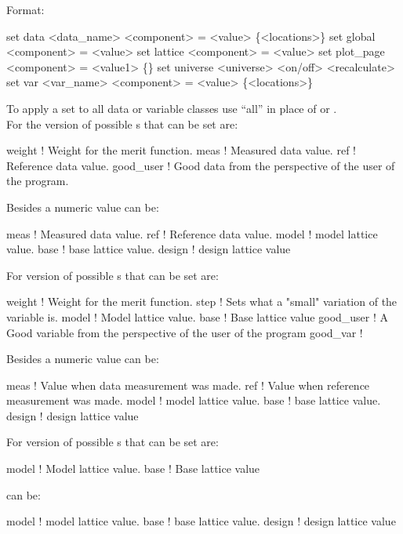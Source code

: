 Format:
\begin{example}
  set data <data_name> <component> = <value> \{<locations>\}
  set global <component> = <value>
  set lattice <component> = <value>
  set plot_page <component> = <value1> \{<value2>\}
  set universe <universe> <on/off> <recalculate>
  set var <var_name> <component> = <value> \{<locations>\}
\end{example}

\vskip 0.2in
To apply a set to all data or variable classes use ``all''
in place of  or . \\

For the  version of  possible 
s that can be set are:
\begin{example}
  weight      ! Weight for the merit function.
  meas        ! Measured data value.
  ref         ! Reference data value.
  good_user   ! Good data from the perspective of the user of the \tao program.
\end{example}
Besides a numeric value  can be:
\begin{example}
  meas        ! Measured data value.
  ref         ! Reference data value.
  model       ! model lattice value.
  base        ! base lattice value.
  design      ! design lattice value
\end{example}
\vskip 0.2in

For  version of  possible 
s that can be set are:
\begin{example}
  weight     ! Weight for the merit function.
  step       ! Sets what a "small" variation of the variable is.
  model      ! Model lattice value.
  base       ! Base lattice value
  good_user  ! A Good variable from the perspective of the user of the \tao program
  good_var   ! 
\end{example}
Besides a numeric value  can be:
\begin{example}
  meas        ! Value when data measurement was made.
  ref         ! Value when reference measurement was made.
  model       ! model lattice value.
  base        ! base lattice value.
  design      ! design lattice value
\end{example}
\vskip 0.2in

For  version of  possible 
s that can be set are:
\begin{example}
  model      ! Model lattice value.
  base       ! Base lattice value
\end{example}
 can be:
\begin{example}
  model       ! model lattice value.
  base        ! base lattice value.
  design      ! design lattice value
\end{example}
\vskip 0.2in

